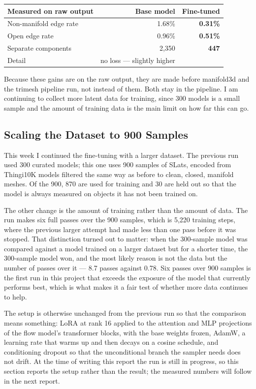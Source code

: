 \documentclass[11pt,a4paper]{article}
\begin{document}
\begin{table}[htbp]\centering\small
\begin{tabular}{@{}lrr@{}}\toprule
\textbf{Measured on raw output} & \textbf{Base model} & \textbf{Fine-tuned} \\ \midrule
Non-manifold edge rate & 1.68\% & \textcolor{good}{\textbf{0.31\%}} \\
Open edge rate & 0.96\% & \textcolor{good}{\textbf{0.51\%}} \\
Separate components & 2,350 & \textcolor{good}{\textbf{447}} \\
Detail & no loss --- slightly higher &  \\
\bottomrule\end{tabular}\end{table}
Because these gains are on the raw output, they are made before manifold3d and the trimesh pipeline run, not instead of them. Both stay in the pipeline. I am continuing to collect more latent data for training, since 300 models is a small sample and the amount of training data is the main limit on how far this can go.

\subsection{Scaling the Dataset to 900 Samples}
This week I continued the fine-tuning with a larger dataset. The previous run used 300 curated models; this one uses 900 samples of SLats, encoded from Thingi10K models filtered the same way as before to clean, closed, manifold meshes. Of the 900, 870 are used for training and 30 are held out so that the model is always measured on objects it has not been trained on.

The other change is the amount of training rather than the amount of data. The run makes six full passes over the 900 samples, which is 5,220 training steps, where the previous larger attempt had made less than one pass before it was stopped. That distinction turned out to matter: when the 300-sample model was compared against a model trained on a larger dataset but for a shorter time, the 300-sample model won, and the most likely reason is not the data but the number of passes over it --- 8.7 passes against 0.78. Six passes over 900 samples is the first run in this project that exceeds the exposure of the model that currently performs best, which is what makes it a fair test of whether more data continues to help.

The setup is otherwise unchanged from the previous run so that the comparison means something: LoRA at rank 16 applied to the attention and MLP projections of the flow model's transformer blocks, with the base weights frozen, AdamW, a learning rate that warms up and then decays on a cosine schedule, and conditioning dropout so that the unconditional branch the sampler needs does not drift. At the time of writing this report the run is still in progress, so this section reports the setup rather than the result; the measured numbers will follow in the next report.
\end{document}
